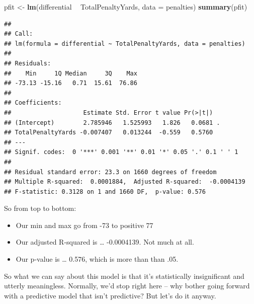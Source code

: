 \documentclass[
]{book}
\newenvironment{Shaded}{\begin{snugshade}}{\end{snugshade}}
\newcommand{\DataTypeTok}[1]{\textcolor[rgb]{0.13,0.29,0.53}{#1}}
\newcommand{\KeywordTok}[1]{\textcolor[rgb]{0.13,0.29,0.53}{\textbf{#1}}}
\newcommand{\NormalTok}[1]{#1}
\newcommand{\OperatorTok}[1]{\textcolor[rgb]{0.81,0.36,0.00}{\textbf{#1}}}
\newcommand{\StringTok}[1]{\textcolor[rgb]{0.31,0.60,0.02}{#1}}
\providecommand{\tightlist}{%
  \setlength{\itemsep}{0pt}\setlength{\parskip}{0pt}}
\begin{document}
\begin{Shaded}
\begin{Highlighting}[]
\NormalTok{pfit <-}\StringTok{ }\KeywordTok{lm}\NormalTok{(differential }\OperatorTok{~}\StringTok{ }\NormalTok{TotalPenaltyYards, }\DataTypeTok{data =}\NormalTok{ penalties)}
\KeywordTok{summary}\NormalTok{(pfit)}
\end{Highlighting}
\end{Shaded}

\begin{verbatim}
## 
## Call:
## lm(formula = differential ~ TotalPenaltyYards, data = penalties)
## 
## Residuals:
##    Min     1Q Median     3Q    Max 
## -73.13 -15.16   0.71  15.61  76.86 
## 
## Coefficients:
##                    Estimate Std. Error t value Pr(>|t|)  
## (Intercept)        2.785946   1.525993   1.826   0.0681 .
## TotalPenaltyYards -0.007407   0.013244  -0.559   0.5760  
## ---
## Signif. codes:  0 '***' 0.001 '**' 0.01 '*' 0.05 '.' 0.1 ' ' 1
## 
## Residual standard error: 23.3 on 1660 degrees of freedom
## Multiple R-squared:  0.0001884,	Adjusted R-squared:  -0.0004139 
## F-statistic: 0.3128 on 1 and 1660 DF,  p-value: 0.576
\end{verbatim}

So from top to bottom:

\begin{itemize}
\tightlist
\item
  Our min and max go from -73 to positive 77
\item
  Our adjusted R-squared is \ldots{} -0.0004139. Not much at all.
\item
  Our p-value is \ldots{} 0.576, which is more than than .05.
\end{itemize}

So what we can say about this model is that it's statistically insignificant and utterly meaningless. Normally, we'd stop right here -- why bother going forward with a predictive model that isn't predictive? But let's do it anyway.

\begin{Shaded}
\end{Shaded}

\begin{Shaded}
\end{Shaded}
\end{document}

